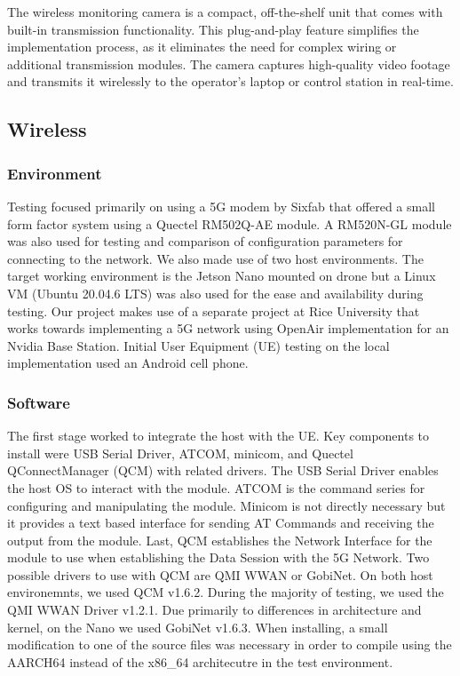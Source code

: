\documentclass[conference]{IEEEtran}
\begin{document}


The wireless monitoring camera is a compact, off-the-shelf unit that comes with built-in transmission functionality. This plug-and-play feature simplifies the implementation process, as it eliminates the need for complex wiring or additional transmission modules. The camera captures high-quality video footage and transmits it wirelessly to the operator's laptop or control station in real-time.
 

\subsection{Wireless}
\subsubsection{Environment}
Testing focused primarily on using a 5G modem by Sixfab that offered a small form factor system using a Quectel RM502Q-AE module. A RM520N-GL module was also used for testing and comparison of configuration parameters for connecting to the network. We also made use of two host environments. The target working environment is the Jetson Nano mounted on drone but a Linux VM (Ubuntu 20.04.6 LTS) was also used for the ease and availability during testing. Our project makes use of a separate project at Rice University that works towards implementing a 5G network using OpenAir implementation for an Nvidia Base Station. Initial User Equipment (UE) testing on the local implementation used an Android cell phone.
\subsubsection{Software}
The first stage worked to integrate the host with the UE. Key components to install were USB Serial Driver, ATCOM, minicom, and Quectel QConnectManager (QCM) with related drivers. The USB Serial Driver enables the host OS to interact with the module. ATCOM is the command series for configuring and manipulating the module. Minicom is not directly necessary but it provides a text based interface for sending AT Commands and receiving the output from the module. Last, QCM establishes the Network Interface for the module to use when establishing the Data Session with the 5G Network. Two possible drivers to use with QCM are QMI WWAN or GobiNet. On both host environemnts, we used QCM v1.6.2. During the majority of testing, we used the QMI WWAN Driver v1.2.1. Due primarily to differences in architecture and kernel, on the Nano we used GobiNet v1.6.3. When installing, a small modification to one of the source files was necessary in order to compile using the AARCH64 instead of the x86\_64 architecutre in the test environment. 
\end{document}
